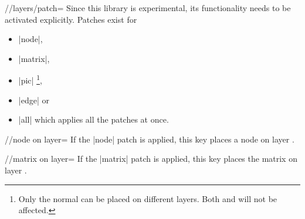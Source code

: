 \begin{multicols}{2}
\begin{key}{/\tikzext/layers/patch=}
Since this library is experimental, its functionality needs to be activated explicitly.
Patches exist for
\begin{itemize}
\item |node|,
\item |matrix|,
\item |pic|%
  \footnote{Only the normal 
            can be placed on different layers.
            Both 
            and 
            will not be affected.},
\item |edge| or
\item |all| which applies all the patches at once.
\end{itemize}
\end{key}
%

\newcolumn
\begin{key}{/\tikzext/node on layer=}
If the |node| patch is applied, this key places a node on layer .
\end{key}

\begin{key}{/\tikzext/matrix on layer=}
If the |matrix| patch is applied, this key places the matrix on layer .
\end{key}


\end{multicols}
